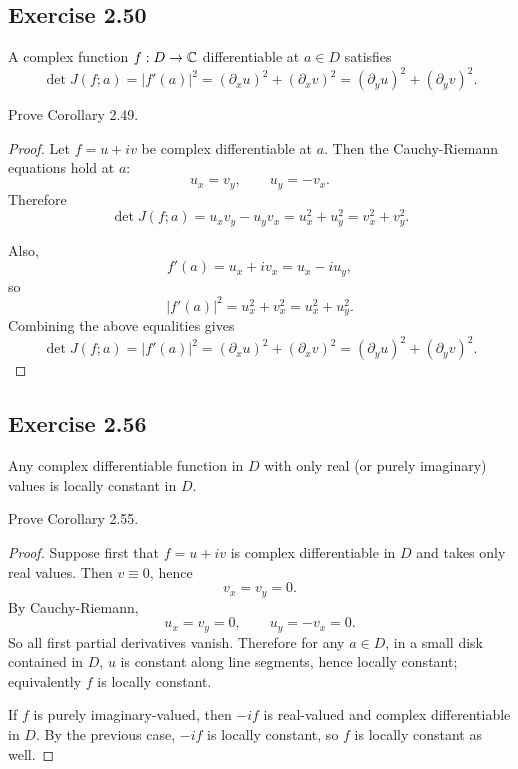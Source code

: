 \documentclass{article}
\begin{document}
\subsection{Exercise 2.50}

\begin{corollary}[Corollary 2.49]
  A complex function $f : D \to \mathbb{C}$ differentiable at $a \in D$ satisfies
  \[
    \det J(f;a) = |f'(a)|^2
    = (\partial_x u)^2 + (\partial_x v)^2
    = (\partial_y u)^2 + (\partial_y v)^2.
  \]
\end{corollary}

Prove Corollary 2.49.

\begin{proof}
  Let $f=u+iv$ be complex differentiable at $a$. Then the Cauchy-Riemann
  equations hold at $a$:
  \[
    u_x=v_y,\qquad u_y=-v_x.
  \]
  Therefore
  \[
    \det J(f;a)=u_x v_y-u_y v_x=u_x^2+u_y^2=v_x^2+v_y^2.
  \]

  Also,
  \[
    f'(a)=u_x+i v_x=u_x-i u_y,
  \]
  so
  \[
    |f'(a)|^2=u_x^2+v_x^2=u_x^2+u_y^2.
  \]
  Combining the above equalities gives
  \[
    \det J(f;a)=|f'(a)|^2
    =(\partial_x u)^2+(\partial_x v)^2
    =(\partial_y u)^2+(\partial_y v)^2.
  \]
\end{proof}

\subsection{Exercise 2.56}

\begin{corollary}[Corollary 2.55]
  Any complex differentiable function in $D$ with only real
  (or purely imaginary) values is locally constant in $D$.
\end{corollary}

Prove Corollary 2.55.

\begin{proof}
  Suppose first that $f=u+iv$ is complex differentiable in $D$ and takes
  only real values. Then $v\equiv 0$, hence
  \[
    v_x=v_y=0.
  \]
  By Cauchy-Riemann,
  \[
    u_x=v_y=0,\qquad u_y=-v_x=0.
  \]
  So all first partial derivatives vanish. Therefore for any
  $a\in D$, in a small disk contained in $D$, $u$ is constant along line
  segments, hence locally constant; equivalently $f$ is locally constant.

  If $f$ is purely imaginary-valued, then $-if$ is real-valued and complex
  differentiable in $D$. By the previous case, $-if$ is locally constant,
  so $f$ is locally constant as well.
\end{proof}
\end{document}
